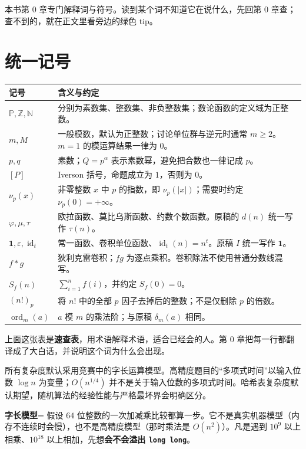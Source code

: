 \documentclass[UTF8,a4paper,11pt,twoside,openright,fontset=fandol]{ctexbook}
\theoremstyle{definition}
\newcommand{\Z}{\mathbb Z}
\newcommand{\N}{\mathbb N}
\newcommand{\Pp}{\mathbb P}
\newcommand{\eps}{\varepsilon}
\newcommand{\one}{\mathbf 1}
\newcommand{\id}{\operatorname{id}}
\newcommand{\ord}{\operatorname{ord}}
\newcommand{\iva}[1]{\left[#1\right]}
\begin{document}
\begin{tip}[导读：不认识的词去哪查]
本书第 0 章专门解释词与符号。读到某个词不知道它在说什么，先回第 0 章查；查不到的，就在正文里看旁边的绿色 tip。
\end{tip}


\section*{统一记号}
\begin{longtable}{p{}p{}}
\toprule
记号 & 含义与约定\\\midrule
$\Pp,\Z,\N$ & 分别为素数集、整数集、非负整数集；数论函数的定义域为正整数。\\
$m,M$ & 一般模数，默认为正整数；讨论单位群与逆元时通常 $m\ge2$。$m=1$ 的模运算结果一律为 $0$。\\
$p,q$ & 素数；$Q=p^\alpha$ 表示素数幂，避免把合数也一律记成 $p$。\\
$\iva{P}$ & Iverson 括号，命题成立为 $1$，否则为 $0$。\\
$\nu_p(x)$ & 非零整数 $x$ 中 $p$ 的指数，即 $\nu_p(|x|)$；需要时约定 $\nu_p(0)=+\infty$。\\
$\varphi,\mu,\tau$ & 欧拉函数、莫比乌斯函数、约数个数函数。原稿的 $d(n)$ 统一写作 $\tau(n)$。\\
$\one,\eps,\id_t$ & 常一函数、卷积单位函数、$\id_t(n)=n^t$。原稿 $I$ 统一写作 $\one$。\\
$f*g$ & 狄利克雷卷积；$fg$ 为逐点乘积。卷积除法不使用普通分数线混写。\\
$S_f(n)$ & $\sum_{i=1}^n f(i)$，并约定 $S_f(0)=0$。\\
$(n!)_p$ & 将 $n!$ 中的全部 $p$ 因子去掉后的整数；不是仅删除 $p$ 的倍数。\\
$\ord_m(a)$ & $a$ 模 $m$ 的乘法阶；与原稿 $\delta_m(a)$ 相同。\\
\bottomrule
\end{longtable}

\begin{tip}[说明：这张速查表怎么用]
上面这张表是\textbf{速查表}，用术语解释术语，适合已经会的人。第 0 章把每一行都翻译成了大白话，并说明这个词为什么会出现。
\end{tip}


所有复杂度默认采用竞赛中的字长运算模型。高精度题目的“多项式时间”以输入位数 $\log n$ 为变量；$O(n^{1/4})$ 并不是关于输入位数的多项式时间。哈希表复杂度默认期望，随机算法的经验性能与严格最坏界会明确区分。

\begin{tip}[词义：字长模型]
\textbf{字长模型}= 假设 $64$ 位整数的一次加减乘比较都算一步。它不是真实机器模型（内存不连续时会慢），也不是高精度模型（那时乘法是 $O(n^2)$）。凡是遇到 $10^9$ 以上相乘、$10^{18}$ 以上相加，先想\textbf{会不会溢出 \texttt{long long}}。
\end{tip}
\end{document}
